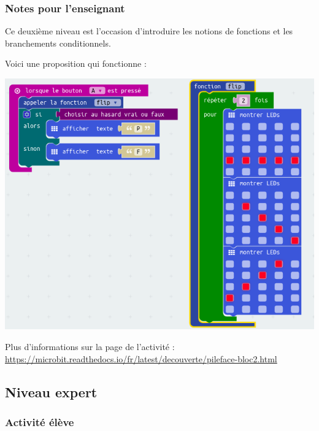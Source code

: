 \newpage
\subsubsection{Notes pour l'enseignant}

Ce deuxième niveau est l'occasion d'introduire les notions de fonctions et les branchements conditionnels.

\begin{methode}
Voici une proposition qui fonctionne :

\includegraphics[width=\linewidth]{res/mbPilefaceN2proposition.png}
\end{methode}

\begin{remarque}
Plus d'informations sur la page de l'activité :\\ \url{https://microbit.readthedocs.io/fr/latest/decouverte/pileface-bloc2.html}
\end{remarque}





%
%
\newpage
\subsection{Niveau expert}
\subsubsection{Activité élève}



